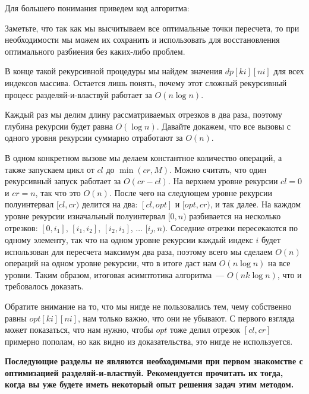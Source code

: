 Для большего понимания приведем код алгоритма:



\begin{observation}
    Заметьте, что так как мы высчитываем все оптимальные точки пересчета, то при необходимости мы можем их сохранить и использовать для восстановления оптимального разбиения без каких-либо проблем.
\end{observation}

В конце такой рекурсивной процедуры мы найдем значения $dp[ki][ni]$ для всех индексов массива. Остается лишь понять, почему этот сложный рекурсивный процесс разделяй-и-властвуй работает за $O(n \log n)$.

Каждый раз мы делим длину рассматриваемых отрезков в два раза, поэтому глубина рекурсии будет равна $O(\log n)$. Давайте докажем, что все вызовы с одного уровня рекурсии суммарно отработают за $O(n)$.

В одном конкретном вызове мы делаем константное количество операций, а также запускаем цикл от $cl$ до $\min(cr, M)$. Можно считать, что один рекурсивный запуск работает за $O(cr - cl)$. На верхнем уровне рекурсии $cl = 0$ и $cr = n$, так что это $O(n)$. После чего на следующем уровне рекурсии полуинтервал $[cl, cr)$ делится на два: $[cl, opt]$ и $[opt, cr)$, и так далее. На каждом уровне рекурсии изначальный полуинтервал $[0, n)$ разбивается на несколько отрезков: $[0, i_1]$, $[i_1, i_2]$, $[i_2, i_3]$, $\ldots$ $[i_j, n)$. Соседние отрезки пересекаются по одному элементу, так что на одном уровне рекурсии каждый индекс $i$ будет использован для пересчета максимум два раза, поэтому всего мы сделаем $O(n)$ операций на одном уровне рекурсии, что в итоге даст нам $O(n \log n)$ на все уровни. Таким образом, итоговая асимптотика алгоритма~--- $O(n k \log n)$, что и требовалось доказать.

\begin{observation}
    Обратите внимание на то, что мы нигде не пользовались тем, чему собственно равны $opt[ki][ni]$, нам только важно, что они не убывают. С первого взгляда может показаться, что нам нужно, чтобы $opt$ тоже делил отрезок $[cl, cr]$ примерно пополам, но как видно из доказательства, это нигде не используется.
\end{observation}

\textbf{Последующие разделы не являются необходимыми при первом знакомстве с оптимизацией разделяй-и-властвуй. Рекомендуется прочитать их тогда, когда вы уже будете иметь некоторый опыт решения задач этим методом.}

